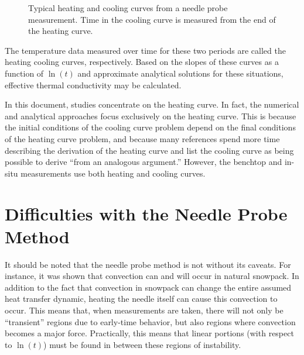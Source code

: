 \begin{figure}[h]
\centering
{}
\caption{Typical heating and cooling curves from a needle probe measurement.
Time in the cooling curve is measured from the end of the heating curve.}
\end{figure}

The temperature data measured over time for these two periods are called the
heating cooling curves, respectively.  Based on the slopes of these
curves as a function of \(\ln(t)\) and approximate analytical solutions for
these situations, effective thermal conductivity may be calculated.

In this document, studies concentrate on the heating curve. In fact, the
numerical and analytical approaches focus exclusively on the heating curve. This
is because the initial conditions of the cooling curve problem depend on the
final conditions of the heating curve problem, and because many references spend
more time describing the derivation of the heating curve and list the cooling
curve as being possible to derive ``from an analogous argument.'' However, the
benchtop and in-situ measurements use both heating and cooling curves.

\section{Difficulties with the Needle Probe Method}

It should be noted that the needle probe method is not without its caveats. For
instance, it was shown that convection can and will occur in natural snowpack.
\cite{sturm3} In addition to the fact that convection in snowpack can change the
entire assumed heat transfer dynamic, heating the needle itself can cause this
convection to occur. This means that, when measurements are taken, there will
not only be ``transient'' regions due to early-time behavior, but also regions
where convection becomes a major force. Practically, this means that linear
portions (with respect to \(\ln(t)\)) must be found in between these regions
of instability.


